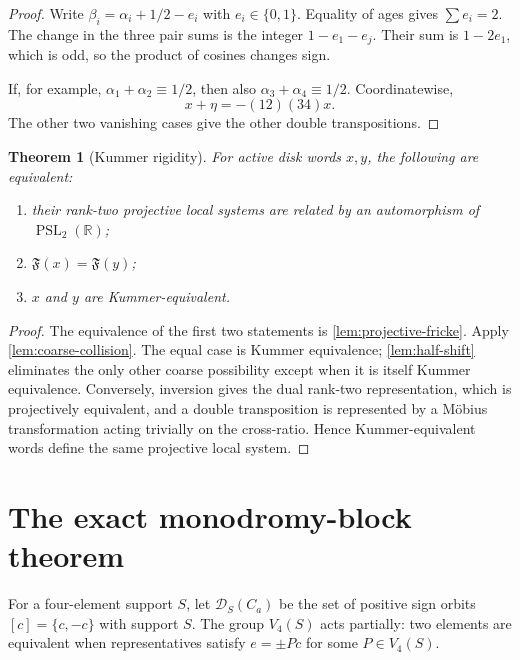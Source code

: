 \documentclass[11pt]{article}
\newtheorem{theorem}{Theorem}[section]
\theoremstyle{definition}
\theoremstyle{remark}
\newcommand{\R}{\mathbb R}
\newcommand{\PSL}{\operatorname{PSL}}
\begin{document}
\begin{proof}
Write $\beta_i=\alpha_i+1/2-e_i$ with $e_i\in\{0,1\}$.  Equality of ages gives $\sum e_i=2$.  The change in the three pair sums is the integer $1-e_1-e_j$.  Their sum is $1-2e_1$, which is odd, so the product of cosines changes sign.

If, for example, $\alpha_1+\alpha_2\equiv1/2$, then also
$\alpha_3+\alpha_4\equiv1/2$.  Coordinatewise,
\[
 x+\eta=-(12)(34)x.
\]
The other two vanishing cases give the other double transpositions.
\end{proof}

\begin{theorem}[Kummer rigidity]\label{thm:kummer-rigidity}
For active disk words $x,y$, the following are equivalent:
\begin{enumerate}
\item their rank-two projective local systems are related by an automorphism of $\PSL_2(\R)$;
\item $\mathfrak F(x)=\mathfrak F(y)$;
\item $x$ and $y$ are Kummer-equivalent.
\end{enumerate}
\end{theorem}

\begin{proof}
The equivalence of the first two statements is \cref{lem:projective-fricke}.  Apply \cref{lem:coarse-collision}.  The equal case is Kummer equivalence; \cref{lem:half-shift} eliminates the only other coarse possibility except when it is itself Kummer equivalence.  Conversely, inversion gives the dual rank-two representation, which is projectively equivalent, and a double transposition is represented by a M\"obius transformation acting trivially on the cross-ratio.  Hence Kummer-equivalent words define the same projective local system.
\end{proof}

\section{The exact monodromy-block theorem}

For a four-element support $S$, let $\mathcal D_S(C_a)$ be the set of positive sign orbits $[c]=\{c,-c\}$ with support $S$.  The group $V_4(S)$ acts partially: two elements are equivalent when representatives satisfy $e=\pm Pc$ for some $P\in V_4(S)$.
\end{document}
